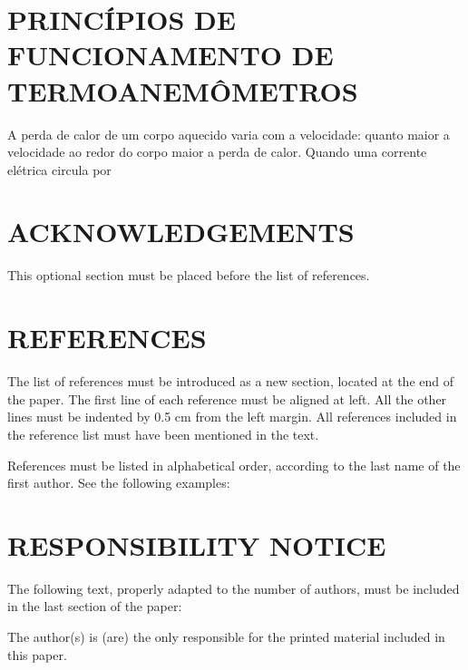 \documentclass[10pt,fleqn,a4paper,twoside]{article}
\begin{document}
\section{PRINCÍPIOS DE FUNCIONAMENTO DE TERMOANEMÔMETROS}

A perda de calor de um corpo aquecido varia com a velocidade: quanto maior a velocidade ao redor do corpo maior a perda de calor. Quando uma corrente elétrica circula por 

\section{ACKNOWLEDGEMENTS}
This optional section must be placed before the list of references.

\section{REFERENCES} 

The list of references must be introduced as a new section, located at the end of the paper. The first line of each reference must be aligned at left.  All the other lines must be indented by 0.5 cm from the left margin. All references included in the reference list must have been mentioned in the text.

References must be listed in alphabetical order, according to the last name of the first author. See the following examples:


\renewcommand{\refname}{}
%

\section{RESPONSIBILITY NOTICE}

The following text, properly adapted to the number of authors, must be included in the last section of the paper:

The author(s) is (are) the only responsible for the printed material included in this paper.
\end{document}
